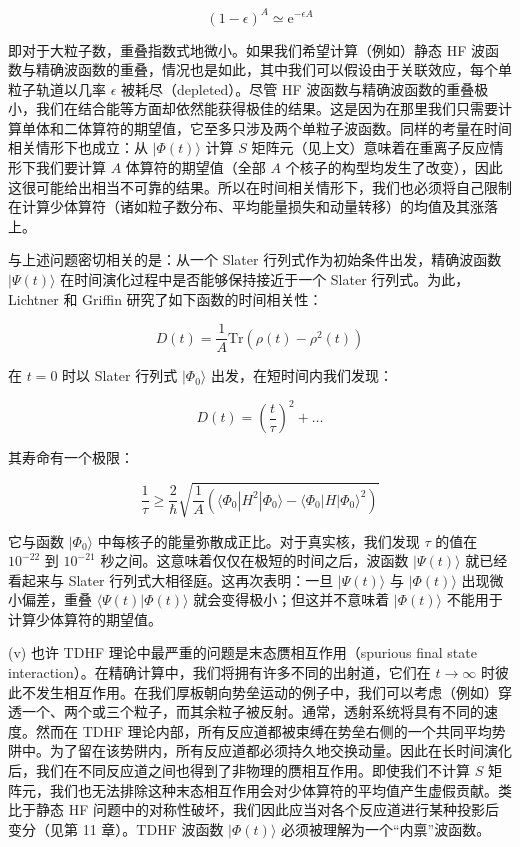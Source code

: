 \begin{equation}
(1-\epsilon)^{A}\simeq\mathrm{e}^{-\epsilon A}\label{eq:12.42}
\end{equation}

即对于大粒子数，重叠指数式地微小。如果我们希望计算（例如）静态 HF 波函数与精确波函数的重叠，情况也是如此，其中我们可以假设由于关联效应，每个单粒子轨道以几率
$\epsilon$ 被耗尽（depleted）\cite{Ne77}。尽管 HF 波函数与精确波函数的重叠极小，我们在结合能等方面却依然能获得极佳的结果。这是因为在那里我们只需要计算单体和二体算符的期望值，它至多只涉及两个单粒子波函数。同样的考量在时间相关情形下也成立：从
$|\Phi(t)\rangle$ 计算 $S$ 矩阵元（见上文）意味着在重离子反应情形下我们要计算 $A$ 体算符的期望值（全部
$A$ 个核子的构型均发生了改变），因此这很可能给出相当不可靠的结果。所以在时间相关情形下，我们也必须将自己限制在计算少体算符（诸如粒子数分布、平均能量损失和动量转移）的均值及其涨落上。

与上述问题密切相关的是：从一个 Slater 行列式作为初始条件出发，精确波函数 $|\Psi(t)\rangle$ 在时间演化过程中是否能够保持接近于一个
Slater 行列式。为此，Lichtner 和 Griffin \cite{LG76a} 研究了如下函数的时间相关性：

\begin{equation}
D(t)=\frac{1}{A}\mathrm{Tr}(\rho(t)-\rho^{2}(t))\label{eq:12.43}
\end{equation}

在 $t=0$ 时以 Slater 行列式 $|\Phi_{0}\rangle$ 出发，在短时间内我们发现：

\begin{equation}
D(t)=\left(\frac{t}{\tau}\right)^{2}+\dots\label{eq:12.44}
\end{equation}

其寿命有一个极限：

\begin{equation}
\frac{1}{\tau}\geqslant\frac{2}{\hbar}\sqrt{\frac{1}{A}\left(\langle\Phi_{0}|H^{2}|\Phi_{0}\rangle-\langle\Phi_{0}|H|\Phi_{0}\rangle^{2}\right)}\label{eq:12.45}
\end{equation}

它与函数 $|\Phi_{0}\rangle$ 中每核子的能量弥散成正比。对于真实核，我们发现 $\tau$ 的值在 $10^{-22}$
到 $10^{-21}$ 秒之间。这意味着仅仅在极短的时间之后，波函数 $|\Psi(t)\rangle$ 就已经看起来与 Slater
行列式大相径庭。这再次表明：一旦 $|\Psi(t)\rangle$ 与 $|\Phi(t)\rangle$ 出现微小偏差，重叠
$\langle\Psi(t)|\Phi(t)\rangle$ 就会变得极小；但这并不意味着 $|\Phi(t)\rangle$
不能用于计算少体算符的期望值。

(v) 也许 TDHF 理论中最严重的问题是末态赝相互作用（spurious final state interaction）。在精确计算中，我们将拥有许多不同的出射道，它们在
$t\to\infty$ 时彼此不发生相互作用。在我们厚板朝向势垒运动的例子中，我们可以考虑（例如）穿透一个、两个或三个粒子，而其余粒子被反射。通常，透射系统将具有不同的速度。然而在
TDHF 理论内部，所有反应道都被束缚在势垒右侧的一个共同平均势阱中。为了留在该势阱内，所有反应道都必须持久地交换动量。因此在长时间演化后，我们在不同反应道之间也得到了非物理的赝相互作用。即使我们不计算
$S$ 矩阵元，我们也无法排除这种末态相互作用会对少体算符的平均值产生虚假贡献。类比于静态 HF 问题中的对称性破坏，我们因此应当对各个反应道进行某种投影后变分（见第
11 章）。TDHF 波函数 $|\Phi(t)\rangle$ 必须被理解为一个“内禀”波函数。

